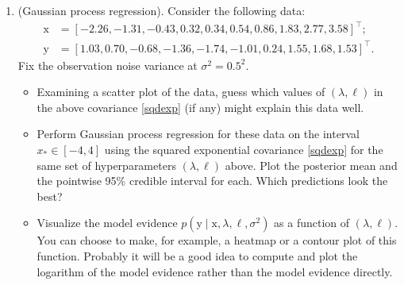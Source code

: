 \documentclass{article}
\newcommand{\given}{\mid}
\renewcommand{\vec}[1]{\bm{\mathrm{#1}}}
\newcommand{\trans}{^\top}
\begin{document}
\begin{enumerate}
\item
  (Gaussian process regression).
  Consider the following data:
  \begin{align*}
    \vec{x}
    &=
    [-2.26, -1.31, -0.43, 0.32, 0.34, 0.54, 0.86, 1.83, 2.77, 3.58]\trans; \\
    \vec{y}
    &=
    [1.03, 0.70, -0.68, -1.36, -1.74, -1.01, 0.24, 1.55, 1.68, 1.53]\trans.
  \end{align*}
  Fix the observation noise variance at $\sigma^2 = 0.5^2$.

  \begin{itemize}
  \item
    Examining a scatter plot of the data, guess which values of $(\lambda,
    \ell)$ in the above covariance \eqref{sqdexp} (if any) might explain this
    data well.
  \item
    Perform Gaussian process regression for these data on the interval $x_\ast
    \in [-4, 4]$ using the squared exponential covariance \eqref{sqdexp} for the
    same set of hyperparameters $(\lambda, \ell)$ above.  Plot the posterior
    mean and the pointwise 95\% credible interval for each.  Which predictions
    look the best?
  \item
    Visualize the model evidence $p(\vec{y} \given \vec{x}, \lambda, \ell,
    \sigma^2)$ as a function of $(\lambda, \ell)$.  You can choose to make, for
    example, a heatmap or a contour plot of this function.  Probably it will be
    a good idea to compute and plot the logarithm of the model evidence rather
    than the model evidence directly.
  \end{itemize}
\end{enumerate}
\end{document}
